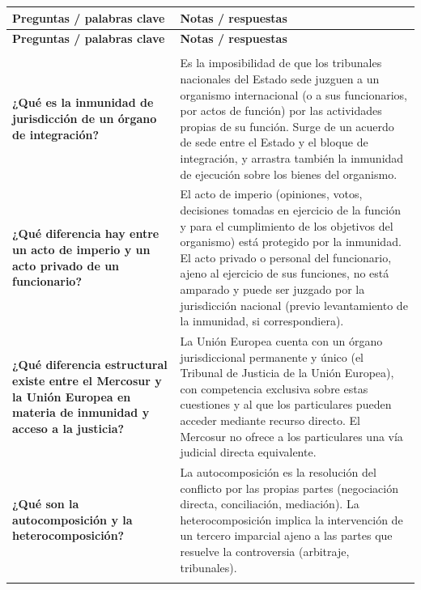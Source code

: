\documentclass[12pt,oneside]{book}
\begin{document}
\begin{longtable}{@{}
    >{\raggedright\arraybackslash}p{}
    >{\raggedright\arraybackslash}p{}@{}
}
\toprule
\textbf{Preguntas / palabras clave} & \textbf{Notas / respuestas} \\
\midrule
\endfirsthead

\toprule
\textbf{Preguntas / palabras clave} & \textbf{Notas / respuestas} \\
\midrule
\endhead

\midrule
\multicolumn{2}{r}{\textit{Continúa en la página siguiente}} \\
\endfoot

\bottomrule
\endlastfoot

\textbf{¿Qué es la inmunidad de jurisdicción de un órgano de integración?} &
Es la imposibilidad de que los tribunales nacionales del Estado sede juzguen a un organismo internacional (o a sus funcionarios, por actos de función) por las actividades propias de su función. Surge de un acuerdo de sede entre el Estado y el bloque de integración, y arrastra también la inmunidad de ejecución sobre los bienes del organismo. \\
\addlinespace

\textbf{¿Qué diferencia hay entre un acto de imperio y un acto privado de un funcionario?} &
El acto de imperio (opiniones, votos, decisiones tomadas en ejercicio de la función y para el cumplimiento de los objetivos del organismo) está protegido por la inmunidad. El acto privado o personal del funcionario, ajeno al ejercicio de sus funciones, no está amparado y puede ser juzgado por la jurisdicción nacional (previo levantamiento de la inmunidad, si correspondiera). \\
\addlinespace

\textbf{¿Qué diferencia estructural existe entre el Mercosur y la Unión Europea en materia de inmunidad y acceso a la justicia?} &
La Unión Europea cuenta con un órgano jurisdiccional permanente y único (el Tribunal de Justicia de la Unión Europea), con competencia exclusiva sobre estas cuestiones y al que los particulares pueden acceder mediante recurso directo. El Mercosur no ofrece a los particulares una vía judicial directa equivalente. \\
\addlinespace

\textbf{¿Qué son la autocomposición y la heterocomposición?} &
La autocomposición es la resolución del conflicto por las propias partes (negociación directa, conciliación, mediación). La heterocomposición implica la intervención de un tercero imparcial ajeno a las partes que resuelve la controversia (arbitraje, tribunales). \\
\addlinespace


\end{longtable}
\end{document}
